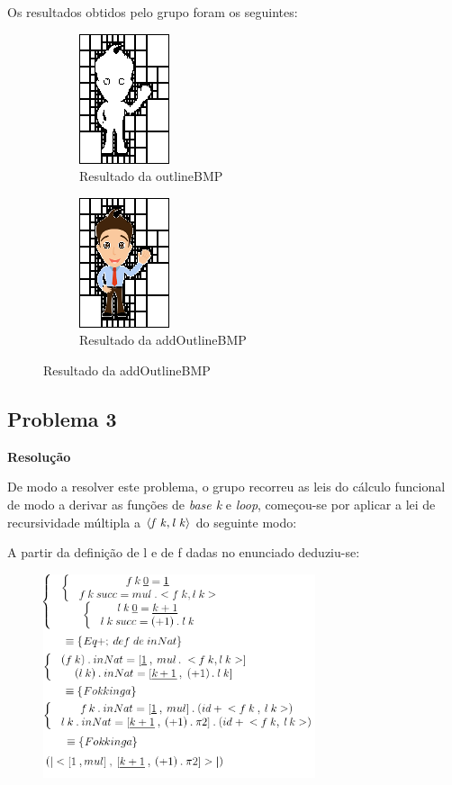 \documentclass[a4paper]{article}
\newcommand{\Varid}[1]{\mathit{#1}}
\begin{document}
\par Os resultados obtidos pelo grupo foram os seguintes: 

\begin{figure}[H]
%
\begin{subfigure}{0.5\textwidth}
\centering
\includegraphics[width=0.2\linewidth]{personOut1}
\caption{Resultado da outlineBMP}
\end{subfigure}
%
\begin{subfigure}{0.5\textwidth}
\centering
\includegraphics[width=0.2\linewidth]{personOut2}
\caption{Resultado da addOutlineBMP}
\end{subfigure}
\end{figure}


\subsection*{Problema 3}

\begin{center}
\large \textbf{Resolução}
\end{center}

\par De modo a resolver este problema, o grupo recorreu as leis do cálculo funcional de modo a derivar 
as funções de \emph{base k} e \emph{loop}, começou-se por aplicar a lei de recursividade múltipla a 
\ensuremath{\conj{\Varid{f}\;\Varid{k}}{\Varid{l}\;\Varid{k}}} do seguinte modo:  


    \par \par A partir da definição de l e de f dadas no enunciado deduziu-se:  


\begin{figure}[H]
    \includegraphics[width=8cm]{splitlk}
\end{figure}
\end{document}
